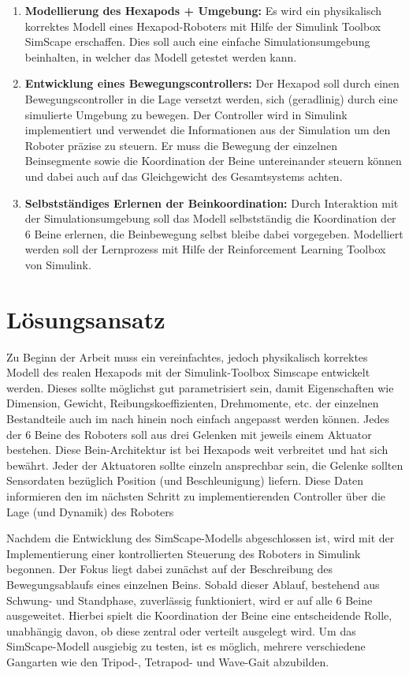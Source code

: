 \begin{enumerate}
	\item \textbf{Modellierung des Hexapods + Umgebung:} Es wird ein physikalisch korrektes Modell eines Hexapod-Roboters mit Hilfe der Simulink Toolbox SimScape erschaffen.
	Dies soll auch eine einfache Simulationsumgebung beinhalten, in welcher das Modell getestet werden kann. 
	
	\item \textbf{Entwicklung eines Bewegungscontrollers:} Der Hexapod soll durch einen Bewegungscontroller in die Lage versetzt werden, sich (geradlinig) durch eine simulierte Umgebung zu bewegen. 
	Der Controller wird in Simulink implementiert und verwendet die Informationen aus der Simulation um den Roboter präzise zu steuern.
	Er muss die Bewegung der einzelnen Beinsegmente sowie die Koordination der Beine untereinander steuern können und dabei auch auf das Gleichgewicht des Gesamtsystems achten.
	
	\item \textbf{Selbstständiges Erlernen der Beinkoordination:} Durch Interaktion mit der Simulationsumgebung soll das Modell selbstständig die Koordination der 6 Beine erlernen, die Beinbewegung selbst bleibe dabei vorgegeben.
	Modelliert werden soll der Lernprozess mit Hilfe der Reinforcement Learning Toolbox von Simulink.
	
\end{enumerate}

\section{Lösungsansatz}
Zu Beginn der Arbeit muss ein vereinfachtes, jedoch physikalisch korrektes Modell des realen Hexapods mit der Simulink-Toolbox Simscape entwickelt werden.
Dieses sollte möglichst gut parametrisiert sein, damit Eigenschaften wie Dimension, Gewicht, Reibungskoeffizienten, Drehmomente, etc. der einzelnen Bestandteile auch im nach hinein noch einfach angepasst werden können.
Jedes der 6 Beine des Roboters soll aus drei Gelenken mit jeweils einem Aktuator bestehen.
Diese Bein-Architektur ist bei Hexapods weit verbreitet und hat sich bewährt.
Jeder der Aktuatoren sollte einzeln ansprechbar sein, die Gelenke sollten Sensordaten bezüglich Position (und Beschleunigung) liefern.
Diese Daten informieren den im nächsten Schritt zu implementierenden Controller über die Lage (und Dynamik) des Roboters 

Nachdem die Entwicklung des SimScape-Modells abgeschlossen ist, wird mit der Implementierung einer kontrollierten Steuerung des Roboters in Simulink begonnen.
Der Fokus liegt dabei zunächst auf der Beschreibung des Bewegungsablaufs eines einzelnen Beins.
Sobald dieser Ablauf, bestehend aus Schwung- und Standphase, zuverlässig funktioniert, wird er auf alle 6 Beine ausgeweitet.
Hierbei spielt die Koordination der Beine eine entscheidende Rolle, unabhängig davon, ob diese zentral oder verteilt ausgelegt wird.
Um das SimScape-Modell ausgiebig zu testen, ist es möglich, mehrere verschiedene Gangarten wie den Tripod-, Tetrapod- und Wave-Gait abzubilden.

